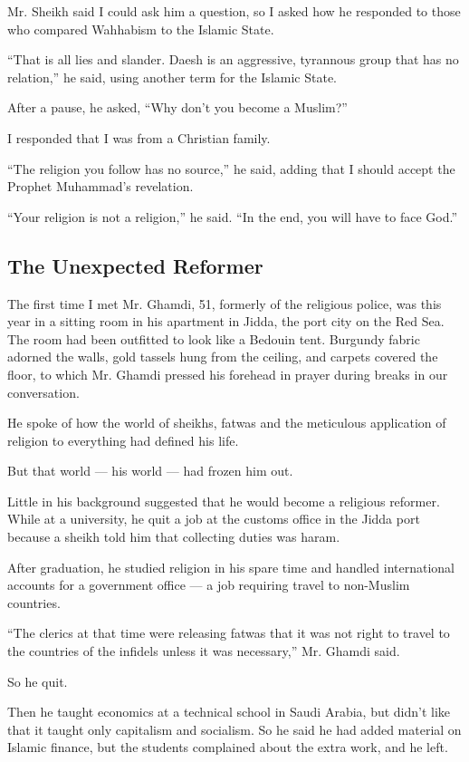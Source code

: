 Mr. Sheikh said I could ask him a question, so I asked how he responded
to those who compared Wahhabism to the Islamic State.

``That is all lies and slander. Daesh is an aggressive, tyrannous group
that has no relation,'' he said, using another term for the Islamic
State.

After a pause, he asked, ``Why don't you become a Muslim?''

I responded that I was from a Christian family.

``The religion you follow has no source,'' he said, adding that I should
accept the Prophet Muhammad's revelation.

``Your religion is not a religion,'' he said. ``In the end, you will
have to face God.''

\hypertarget{the-unexpected-reformer}{%
\subsection{The Unexpected Reformer}\label{the-unexpected-reformer}}

The first time I met Mr. Ghamdi, 51, formerly of the religious police,
was this year in a sitting room in his apartment in Jidda, the port city
on the Red Sea. The room had been outfitted to look like a Bedouin tent.
Burgundy fabric adorned the walls, gold tassels hung from the ceiling,
and carpets covered the floor, to which Mr. Ghamdi pressed his forehead
in prayer during breaks in our conversation.

He spoke of how the world of sheikhs, fatwas and the meticulous
application of religion to everything had defined his life.

But that world --- his world --- had frozen him out.

Little in his background suggested that he would become a religious
reformer. While at a university, he quit a job at the customs office in
the Jidda port because a sheikh told him that collecting duties was
haram.

After graduation, he studied religion in his spare time and handled
international accounts for a government office --- a job requiring
travel to non-Muslim countries.

``The clerics at that time were releasing fatwas that it was not right
to travel to the countries of the infidels unless it was necessary,''
Mr. Ghamdi said.

So he quit.

Then he taught economics at a technical school in Saudi Arabia, but
didn't like that it taught only capitalism and socialism. So he said he
had added material on Islamic finance, but the students complained about
the extra work, and he left.


